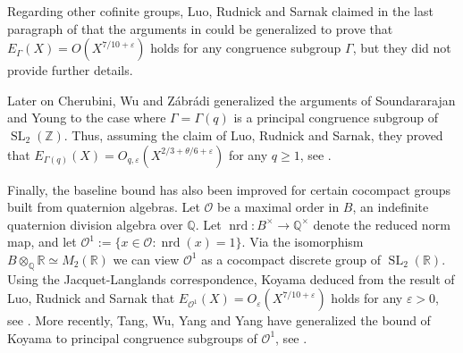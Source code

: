 \documentclass{article}
\theoremstyle{named}
\newcommand{\Z}{\mathbb{Z}}
\newcommand{\Q}{\mathbb{Q}}
\newcommand{\R}{\mathbb{R}}
\renewcommand{\O}{\mathcal{O}}
\DeclareMathOperator{\SL}{SL}
\DeclareMathOperator{\nrd}{nrd}
\begin{document}
Regarding other cofinite groups, Luo, Rudnick and Sarnak claimed in the last paragraph of \cite{sarnakluorudnick1995} that the arguments in \cite{luosarnak} could be generalized to prove that $E_\Gamma(X) = O(X^{7/10 + \varepsilon})$ holds for any congruence subgroup $\Gamma$, but they did not provide further details. 

Later on Cherubini, Wu and Zábrádi generalized the arguments of Soundararajan and Young to the case where $\Gamma = \Gamma(q)$ is a principal congruence subgroup of $\SL_2(\Z)$. Thus, assuming the claim of Luo, Rudnick and Sarnak, they proved that $E_{\Gamma(q)}(X) = O_{q, \varepsilon}(X^{2/3 + \theta/6 + \varepsilon})$ for any $q \geq 1$, see \cite[Theorem 1.10]{cherubini_wu}.

Finally, the baseline bound has also been improved for certain cocompact groups built from quaternion algebras. Let $\O$ be a maximal order in $B$, an indefinite quaternion division algebra over $\Q$. Let $\nrd: B^\times \rightarrow \Q^\times$ denote the reduced norm map, and let $\O^1 := \{x \in \O : \nrd(x) = 1\}$. Via the isomorphism $B \otimes_\Q \R \simeq M_2(\R)$ we can view $\O^1$ as a cocompact discrete group of $\SL_2(\R)$. Using the Jacquet-Langlands correspondence, Koyama deduced from the result of Luo, Rudnick and Sarnak that $E_{\O^1}(X) = O_\varepsilon(X^{7/10 + \varepsilon})$ holds for any $\varepsilon > 0$, see \cite{koyama}. More recently, Tang, Wu, Yang and Yang have generalized the bound of Koyama to principal congruence subgroups of $\O^1$, see \cite{tang2025}.
\end{document}
